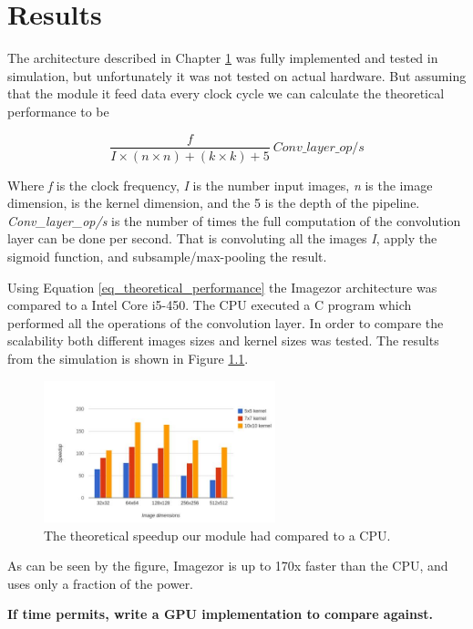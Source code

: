 \chapter{Results} \label{chap_results}

The architecture described in Chapter \ref{chap_results} was fully implemented and tested in simulation, but unfortunately it was not tested on actual hardware. But assuming that the module it feed data every clock cycle we can calculate the theoretical performance to be 

\begin{equation} \label{eq_theoretical_performance}
\frac{f}{I\times(n \times n) + (k \times k) + 5} ~Conv\_layer\_op/s
\end{equation}

Where \textit{f} is the clock frequency, \textit{I} is the number input images, \textit{n} is the image dimension,  is the kernel dimension, and the 5 is the depth of the pipeline. \textit{Conv\_layer\_op/s} is the number of times the full computation of the convolution layer can be done per second. That is convoluting all the images \textit{I}, apply the sigmoid function, and subsample/max-pooling the result. 

Using Equation \ref{eq_theoretical_performance} the Imagezor architecture was  compared  to a Intel Core i5-450. The CPU executed a C program which performed all the operations of the convolution layer. In order to compare the scalability both different images sizes and kernel sizes was tested. The results from the simulation is shown in Figure \ref{fig_cpu_cmp_results}.
\begin{figure}
  \centering
      \includegraphics[width=0.6\textwidth]{Figures/Results/Speedup_chart}
  \caption{The theoretical speedup our module had compared to a CPU.}
  \label{fig_cpu_cmp_results}
\end{figure}

As can be seen by the figure, Imagezor is up to 170x faster than the CPU, and uses only a fraction of the power.  

\textbf{If time permits, write a GPU implementation to compare against.}

